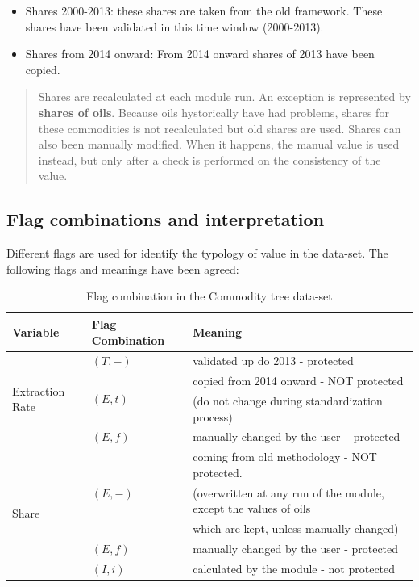 \documentclass[]{article}
\providecommand{\tightlist}{%
  \setlength{\itemsep}{0pt}\setlength{\parskip}{0pt}}
\begin{document}
\begin{itemize}
\tightlist
\item
  Shares 2000-2013: these shares are taken from the old framework. These
  shares have been validated in this time window (2000-2013).
\item
  Shares from 2014 onward: From 2014 onward shares of 2013 have been
  copied.
\end{itemize}

\begin{quote}
Shares are recalculated at each module run. An exception is represented
by \textbf{shares of oils}. Because oils hystorically have had problems,
shares for these commodities is not recalculated but old shares are
used. Shares can also been manually modified. When it happens, the
manual value is used instead, but only after a check is performed on the
consistency of the value.
\end{quote}

\newpage

\subsection{Flag combinations and
interpretation}\label{flag-combinations-and-interpretation}

Different flags are used for identify the typology of value in the
data-set. The following flags and meanings have been agreed:

\begin{table}[h]
\caption {Flag combination in the Commodity tree data-set}
\centering
\begin{tabular}{|l|l|l|}
\toprule
\bf{Variable} & \bf{Flag Combination} & \bf{Meaning}\\ 
\midrule
\multirow{4}{*}{Extraction Rate} & $(T , -)$  & validated up do 2013 - protected \\
\cline{2-3}
& \multirow{2}{*}{$(E , t)$}  &   copied from 2014 onward - NOT protected \\
& &  (do not change during standardization process)\\ 
\cline{2-3}
& $(E , f)$  &   manually changed by the user – protected\\ 
\cline{1-3}
\multirow{5}{*}{Share} & \multirow{3}{*}{$(E , -)$}  & coming from old methodology - NOT protected.\\
& &  (overwritten at any run of the module, except the values of oils\\
& &   which are kept, unless manually changed) \\
\cline{2-3}
& $(E , f)$  &  manually changed by the user - protected\\ 
\cline{2-3}
& $(I , i)$  &   calculated by the module - not protected\\ 
\cline{1-3}
\end{tabular}
\end{table}
\end{document}
